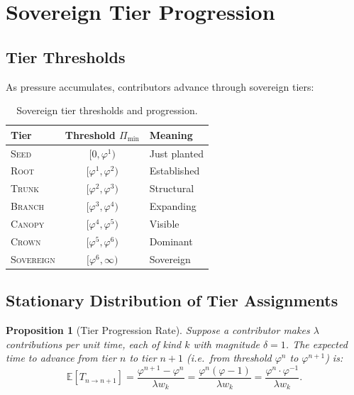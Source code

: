 \documentclass[12pt]{article}
\newtheorem{proposition}[theorem]{Proposition}
\newcommand{\PHI}{\varphi}
\newcommand{\PHIINV}{\varphi^{-1}}
\newcommand{\tier}[1]{\textsc{#1}}
\begin{document}
\section{Sovereign Tier Progression}
\label{sec:tiers}

\subsection{Tier Thresholds}

As pressure accumulates, contributors advance through sovereign tiers:

\begin{table}[h]
  \centering
  \caption{Sovereign tier thresholds and progression.}
  \label{tab:tiers}
  \begin{tabular}{lcl}
    \toprule
    Tier & Threshold $\Pi_\text{min}$ & Meaning \\
    \midrule
    \tier{Seed}     & $[0, \PHI^1)$      & Just planted \\
    \tier{Root}     & $[\PHI^1, \PHI^2)$ & Established \\
    \tier{Trunk}    & $[\PHI^2, \PHI^3)$ & Structural \\
    \tier{Branch}   & $[\PHI^3, \PHI^4)$ & Expanding \\
    \tier{Canopy}   & $[\PHI^4, \PHI^5)$ & Visible \\
    \tier{Crown}    & $[\PHI^5, \PHI^6)$ & Dominant \\
    \tier{Sovereign}& $[\PHI^6, \infty)$ & Sovereign \\
    \bottomrule
  \end{tabular}
\end{table}

\subsection{Stationary Distribution of Tier Assignments}

\begin{proposition}[Tier Progression Rate]
  Suppose a contributor makes $\lambda$ contributions per unit time, each of
  kind $k$ with magnitude $\delta = 1$.  The expected time to advance from
  tier $n$ to tier $n+1$ (i.e.\ from threshold $\PHI^n$ to $\PHI^{n+1}$) is:
  \[
    \mathbb{E}[T_{n \to n+1}] = \frac{\PHI^{n+1} - \PHI^n}{\lambda w_k}
    = \frac{\PHI^n(\PHI - 1)}{\lambda w_k} = \frac{\PHI^n \cdot \PHIINV}{\lambda w_k}.
  \]
\end{proposition}
\end{document}
